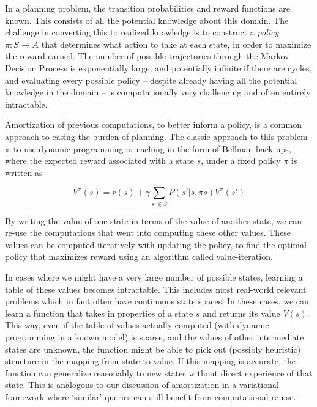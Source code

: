 
In a planning problem, the transition probabilities and reward functions are known. This consists of all the potential knowledge about this domain. The challenge in converting this to realized knowledge is to construct a \textit{policy} $\pi: S \rightarrow A$ that determines what action to take at each state, in order to maximize the reward earned. The number of possible trajectories through the Markov Decision Process is exponentially large, and potentially infinite if there are cycles, and evaluating every possible policy -- despite already having all the potential knowledge in the domain -- is computationally very challenging and often entirely intractable. 

Amortization of previous computations, to better inform a policy, is a common approach to easing the burden of planning. The classic approach to this problem is to use dynamic programming or caching in the form of Bellman back-ups, where the expected reward associated with a state $s$, under a fixed policy $\pi$ is written as

\begin{equation}
V^{\pi}(s) = r(s) + \gamma \sum_{s' \in S} P(s' | s, \pi{s}) V^{\pi}(s')
\end{equation}

By writing the value of one state in terms of the value of another state, we can re-use the computations that went into computing these other values. These values can be computed iteratively with updating the policy, to find the optimal policy that maximizes reward using an algorithm called value-iteration. 

In cases where we might have a very large number of possible states, learning a table of these values becomes intractable. This includes most real-world relevant problems which in fact often have continuous state spaces. In these cases, we can learn a function that takes in properties of a state $s$ and returns its value $V(s)$. This way, even if the table of values actually computed (with dynamic programming in a known model) is sparse, and the values of other intermediate states are unknown, the function might be able to pick out (possibly heuristic) structure in the mapping from state to value. If this mapping is accurate, the function can generalize reasonably to new states without direct experience of that state. This is analogous to our discussion of amortization in a variational framework where `similar' queries can still benefit from computational re-use.

